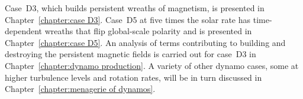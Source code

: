 Case~D3, which builds persistent wreaths of magnetism, is presented in
Chapter~\ref{chapter:case D3}.  Case~D5 at five times the solar rate has
time-dependent wreaths that flip global-scale polarity and is
presented in Chapter~\ref{chapter:case D5}. 
An analysis of terms contributing to building and destroying the
persistent magnetic fields is carried out for case~D3 in
Chapter~\ref{chapter:dynamo production}.
A variety of other dynamo cases, some at higher turbulence levels and
rotation rates, will be in turn discussed in Chapter~\ref{chapter:menagerie of dynamos}.





